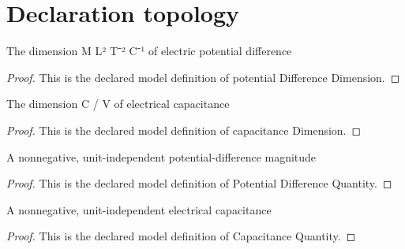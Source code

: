 \section{Declaration topology}
\begin{definition}
  \label{def:physics:phyx-mini-0879:phyxminiproblems-problemphyxmini0879-potentialdifferencedimension}
  The dimension M L² T⁻² C⁻¹ of electric potential difference
\end{definition}
\begin{proof}
  This is the declared model definition of potential Difference Dimension.
\end{proof}
\begin{definition}
  \label{def:physics:phyx-mini-0879:phyxminiproblems-problemphyxmini0879-capacitancedimension}
  The dimension C / V of electrical capacitance
\end{definition}
\begin{proof}
  This is the declared model definition of capacitance Dimension.
\end{proof}
\begin{definition}
  \label{def:physics:phyx-mini-0879:phyxminiproblems-problemphyxmini0879-potentialdifferencequantity}
  A nonnegative, unit-independent potential-difference magnitude
\end{definition}
\begin{proof}
  This is the declared model definition of Potential Difference Quantity.
\end{proof}
\begin{definition}
  \label{def:physics:phyx-mini-0879:phyxminiproblems-problemphyxmini0879-capacitancequantity}
  A nonnegative, unit-independent electrical capacitance
\end{definition}
\begin{proof}
  This is the declared model definition of Capacitance Quantity.
\end{proof}
